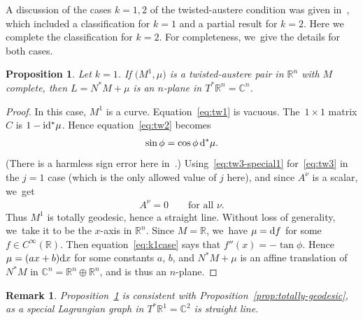 \documentclass[pdftex]{sigma}
\def\R{\mathbb{R}}
\def\C{\mathbb{C}}
\def\ri{\mathrm{i}}
\newtheorem{Proposition}[Theorem]{Proposition}
\newtheorem{Remark}[Theorem]{Remark}}
\numberwithin{equation}{section}
\begin{document}
A discussion of the cases $k=1,2$ of the twisted-austere condition was given in~\cite[Section~2]{KL}, which included a classification for $k=1$ and a partial result for $k=2$. Here we complete the classification for $k=2$. For completeness, we~give the details for both cases.

\begin{Proposition} \label{prop:k1}
Let $k=1$. If $\big(M^1, \mu\big)$ is a twisted-austere pair in $\R^n$ with $M$ complete, then $L = N^* M + \mu$ is an $n$-plane in $T^* \R^n = \C^n$.
\end{Proposition}
\begin{proof}
In this case, $M^1$ is a curve. Equation~\eqref{eq:tw1} is vacuous. The~$1 \times 1$ matrix $C$ is $1 - \ri {\rm d}^* \mu$. Hence equation~\eqref{eq:tw2} becomes
\begin{gather} \label{eq:k1case}
\sin \phi = \cos \phi \, {\rm d}^* \mu.
\end{gather}
(There is a harmless sign error here in~\cite{KL}.) Using~\eqref{eq:tw3-special1} for~\eqref{eq:tw3} in the $j=1$ case (which is the only allowed value of $j$ here), and since $A^{\nu}$ is a scalar, we~get
\begin{gather*}
A^{\nu} = 0 \qquad \text{for all $\nu$}.
\end{gather*}
Thus $M^1$ is totally geodesic, hence a straight line. Without loss of generality, we~take it to be the $x$-axis in $\R^n$. Since $M = \R$, we~have $\mu = {\rm d}f$ for some $f \in C^{\infty} (\R)$. Then equation~\eqref{eq:k1case} says that $f''(x) = -\tan \phi$. Hence $\mu = (a x + b) {\rm d}x$ for some constants $a$, $b$, and $N^* M + \mu$ is an affine translation of $N^* M$ in $\C^n = \R^n \oplus \R^n$, and is thus an $n$-plane.
\end{proof}

\begin{Remark} %
Proposition~\ref{prop:k1} is consistent with Proposition~\ref{prop:totally-geodesic}, as a special Lagrangian graph in $T^* \R^1 = \C^2$ is straight line.
\end{Remark}
\end{document}
